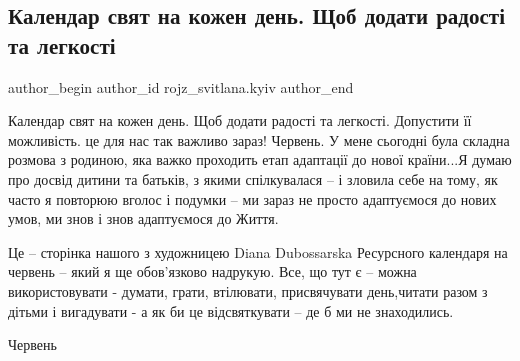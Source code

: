  
 
 
 
 
 
\subsection{Календар свят на кожен день. Щоб додати радості та легкості}
\label{sec:09_06_2022.fb.rojz_svitlana.kyiv.1.kalendar_svjat}
 
\ifcmt
 author_begin
   author_id rojz_svitlana.kyiv
 author_end
\fi

Календар свят на кожен день. Щоб додати радості та легкості. Допустити її
можливість. це для нас так важливо зараз! Червень. У мене сьогодні була складна
розмова з родиною, яка важко проходить етап адаптації до нової країни...Я думаю
про досвід дитини та батьків, з якими  спілкувалася – і зловила себе на тому,
як часто я повторюю вголос і подумки – ми зараз не просто адаптуємося до нових
умов, ми знов і знов адаптуємося до Життя. 

Це – сторінка нашого з художницею Diana Dubossarska Ресурсного календаря на
червень  – який я ще обов'язково надрукую.  Все, що тут є – можна
використовувати - думати, грати, втілювати, присвячувати день,читати разом з
дітьми і вигадувати - а як би це відсвяткувати  – де б ми не знаходились. 


Червень


